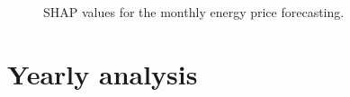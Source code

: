 \begin{figure}[H]
    \caption{SHAP values for the monthly energy price forecasting.}
    \label{fig:shap-monthly}
\end{figure}



\section{Yearly analysis}